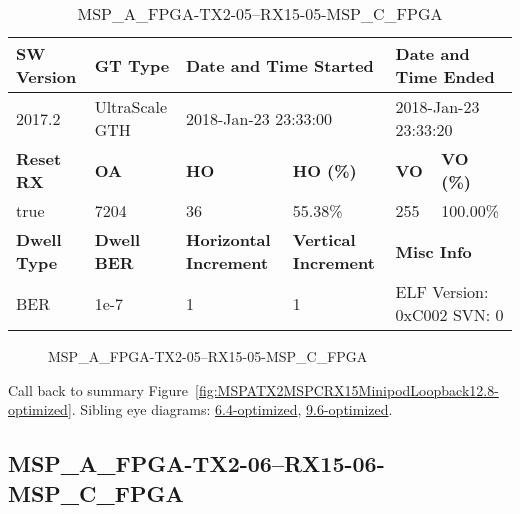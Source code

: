 \begin{table}[h]
\centering
\caption{MSP\_A\_FPGA-TX2-05--RX15-05-MSP\_C\_FPGA}
\label{tab:MSPAFPGATX205RX1505MSPCFPGA12.8-optimized}
\begin{tabular}{@{}|l|l|l|l|l|l|@{}}
\toprule
\textbf{SW Version}                & \textbf{GT Type}   & \multicolumn{2}{l|}{\textbf{Date and Time Started}}            & \multicolumn{2}{l|}{\textbf{Date and Time Ended}}        \\ \midrule
2017.2                       & UltraScale GTH          & \multicolumn{2}{l|}{2018-Jan-23 23:33:00}                   & \multicolumn{2}{l|}{2018-Jan-23 23:33:20}               \\ \midrule
\textbf{Reset RX}                  & \textbf{OA} & \textbf{HO}   & \textbf{HO (\%)} & \textbf{VO} & \textbf{VO (\%)} \\ \midrule
true & 7204        & 36          & 55.38\%        & 255        & 100.00\%       \\ \midrule
\textbf{Dwell Type}                & \textbf{Dwell BER} & \textbf{Horizontal Increment} & \textbf{Vertical Increment}    & \multicolumn{2}{l|}{\textbf{Misc Info}}                  \\ \midrule
BER                            & 1e-7        & 1        & 1           & \multicolumn{2}{l|}{ELF Version: 0xC002 SVN: 0}                         \\ \bottomrule
\end{tabular}
\end{table}

\begin{figure}[h]
\caption{MSP\_A\_FPGA-TX2-05--RX15-05-MSP\_C\_FPGA} \label{fig:MSPAFPGATX205RX1505MSPCFPGA12.8-optimized}
\end{figure}

Call back to summary Figure~\ref{fig:MSPATX2MSPCRX15MinipodLoopback12.8-optimized}.
Sibling eye diagrams: \hyperref[sec:MSPAFPGATX205RX1505MSPCFPGA6.4-optimized]{6.4-optimized}, \hyperref[sec:MSPAFPGATX205RX1505MSPCFPGA9.6-optimized]{9.6-optimized}.

\clearpage
\newpage


\subsection{MSP\_A\_FPGA-TX2-06--RX15-06-MSP\_C\_FPGA}\label{sec:MSPAFPGATX206RX1506MSPCFPGA12.8-optimized}


